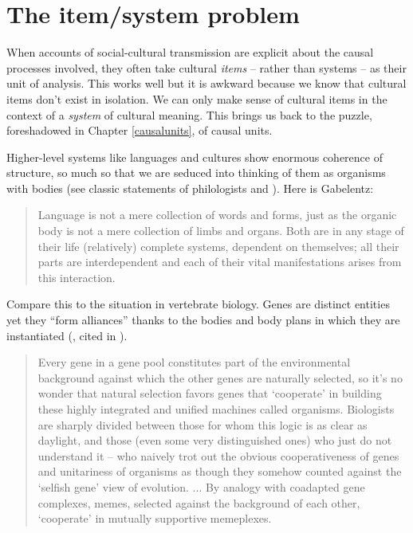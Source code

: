 
\chapter{The item/system problem}
\label{itemsystemproblem}


When accounts of social-cultural transmission are explicit about the 
causal processes involved, they often take cultural \textit{items} -- rather than systems -- as their unit of analysis. This works well 
but it is awkward because we know that cultural items don't exist in 
isolation. We can only make sense of cultural items in the context of a 
\textit{system} of cultural meaning. This brings us back to the puzzle, foreshadowed in Chapter \ref{causalunits}, of causal units. 



Higher-level systems like languages and cultures show enormous coherence 
of structure, so much so that we are seduced into thinking of them as organisms with 
bodies (see classic statements of philologists \citealt{gabelentz_sprachwissenschaft_1891} and \citealt[16]{meillet_linguistique_1926}). Here is Gabelentz:

\begin{quotation}
Language is not a mere collection of words and forms, just as the organic body is not a mere collection of limbs and organs. Both are in any stage of their life (relatively) complete systems, dependent on themselves; all their parts are interdependent and each of their vital manifestations arises from this interaction. \citep[10]{gabelentz_sprachwissenschaft_1891}
\end{quotation}

Compare this to the situation in vertebrate 
biology. Genes are distinct entities yet they ``form 
alliances'' thanks to the bodies and body plans in which they are 
instantiated (\citealt{gould_ontogeny_1977}, cited in \citealt[117]{dawkins_extended_1982}). 

\begin{quotation}
Every gene in a gene pool constitutes part of the environmental background against which the other genes are naturally selected, so it's no wonder that natural selection favors genes that `cooperate' in building these highly integrated and unified machines called organisms.  Biologists are sharply divided between those for whom this logic is as clear as daylight, and those (even some very distinguished ones) who just do not understand it -- who naively trot out the obvious cooperativeness of genes and unitariness of organisms as though they somehow counted against the `selfish gene' view of evolution. ... By analogy with coadapted gene complexes, memes, selected against the background of each other, `cooperate' in mutually supportive memeplexes. \citep[xv]{DawkinsMemeForeword1999}
\end{quotation}

